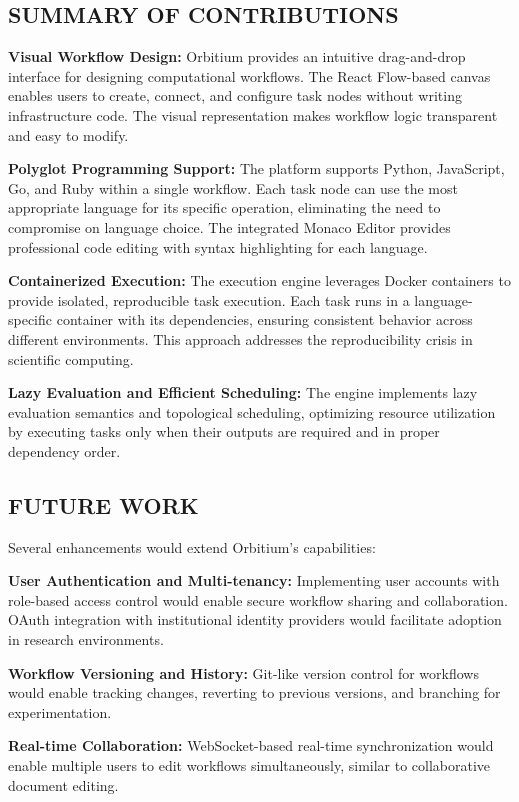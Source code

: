\documentclass[12pt]{article}
\begin{document}
\subsection{SUMMARY OF CONTRIBUTIONS}

\textbf{Visual Workflow Design:} Orbitium provides an intuitive drag-and-drop interface for designing computational workflows. The React Flow-based canvas enables users to create, connect, and configure task nodes without writing infrastructure code. The visual representation makes workflow logic transparent and easy to modify.

\textbf{Polyglot Programming Support:} The platform supports Python, JavaScript, Go, and Ruby within a single workflow. Each task node can use the most appropriate language for its specific operation, eliminating the need to compromise on language choice. The integrated Monaco Editor provides professional code editing with syntax highlighting for each language.

\textbf{Containerized Execution:} The execution engine leverages Docker containers to provide isolated, reproducible task execution. Each task runs in a language-specific container with its dependencies, ensuring consistent behavior across different environments. This approach addresses the reproducibility crisis in scientific computing.

\textbf{Lazy Evaluation and Efficient Scheduling:} The engine implements lazy evaluation semantics and topological scheduling, optimizing resource utilization by executing tasks only when their outputs are required and in proper dependency order.

\subsection{FUTURE WORK}

Several enhancements would extend Orbitium's capabilities:

\textbf{User Authentication and Multi-tenancy:} Implementing user accounts with role-based access control would enable secure workflow sharing and collaboration. OAuth integration with institutional identity providers would facilitate adoption in research environments.

\textbf{Workflow Versioning and History:} Git-like version control for workflows would enable tracking changes, reverting to previous versions, and branching for experimentation.

\textbf{Real-time Collaboration:} WebSocket-based real-time synchronization would enable multiple users to edit workflows simultaneously, similar to collaborative document editing.
\end{document}
